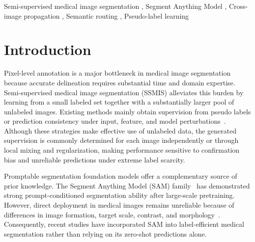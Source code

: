 \documentclass[a4paper,fleqn]{cas-dc}
\begin{document}

\begin{keywords}
Semi-supervised medical image segmentation \sep
Segment Anything Model \sep
Cross-image propagation \sep
Semantic routing \sep
Pseudo-label learning
\end{keywords}

\maketitle




\section{Introduction}

Pixel-level annotation is a major bottleneck in medical image segmentation because accurate delineation requires substantial time and domain expertise. Semi-supervised medical image segmentation (SSMIS) alleviates this burden by learning from a small labeled set together with a substantially larger pool of unlabeled images. Existing methods mainly obtain supervision from pseudo labels or prediction consistency under input, feature, and model perturbations~\cite{tarvainen2017meanteacher,chen2021cps,luo2022crossteaching,wu2022mcnet,bai2023bcp,assefa2025dycon}. Although these strategies make effective use of unlabeled data, the generated supervision is commonly determined for each image independently or through local mixing and regularization, making performance sensitive to confirmation bias and unreliable predictions under extreme label scarcity.

Promptable segmentation foundation models offer a complementary source of prior knowledge. The Segment Anything Model (SAM) family~\cite{kirillov2023segment,ravi2025sam2,carion2026sam3} has demonstrated strong prompt-conditioned segmentation ability after large-scale pretraining. However, direct deployment in medical images remains unreliable because of differences in image formation, target scale, contrast, and morphology~\cite{mazurowski2023samexperiment,ma2024medsam}. Consequently, recent studies have incorporated SAM into label-efficient medical segmentation rather than relying on its zero-shot predictions alone.
\end{document}
